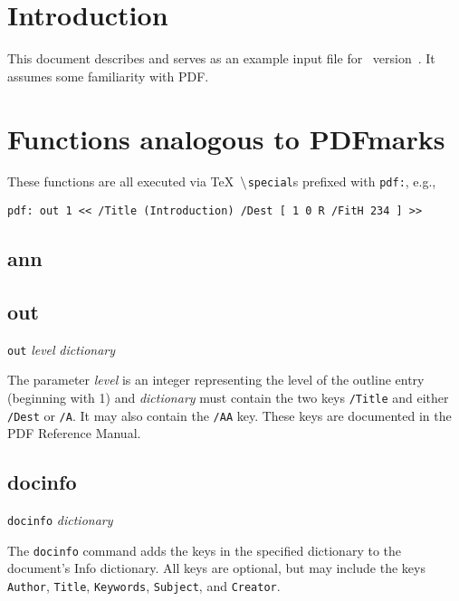\section{Introduction}
This document describes and serves as an example input file for \dvipdf~version~\version.
It assumes some familiarity with PDF.

\section{Functions analogous to PDFmarks}
These functions are all executed via \TeX\ $\tt \backslash${\tt special}s
prefixed with {\tt pdf:}, e.g.,

{\tt pdf: out 1 << /Title (Introduction) /Dest [ 1 0 R /FitH 234 ] >> }

\subsection{ann}
\subsection{out}
{\tt out} {\it level} {\it dictionary}

The parameter {\it level} is an integer representing the level of the outline
entry (beginning with 1) and {\it dictionary} must contain
the two keys {\tt /Title} and either {\tt /Dest} or {\tt /A}.
It may also contain the {\tt /AA} key.  These keys are documented
in the PDF Reference Manual.



\subsection{docinfo}

{\tt docinfo} {\it dictionary}

The {\tt docinfo} command adds the keys in the specified dictionary to the
document's Info dictionary.  All keys are optional, but may include
the keys {\tt Author}, {\tt Title}, {\tt Keywords}, {\tt Subject},
and {\tt Creator}.

